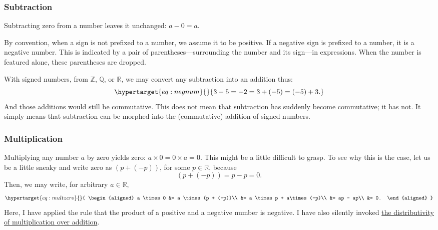 \documentclass[
  a4paper,
]{article}
\begin{document}
\hypertarget{subtraction}{%
\subsubsection{Subtraction}\label{subtraction}}

Subtracting zero from a number leaves it unchanged: \(a - 0 = a\).

By convention, when a sign is not prefixed to a number, we assume it to
be positive. If a negative sign is prefixed to a number, it is a
negative number. This is indicated by a pair of
parentheses---surrounding the number and its sign---in expressions. When
the number is featured alone, these parentheses are dropped.

With signed numbers, from \(\mathbb{Z}\), \(\mathbb{Q}\), or
\(\mathbb{R}\), we may convert any subtraction into an addition thus:
\begin{equation}\protect\hypertarget{eq:negnum}{}{
3 - 5 = -2 = 3 + (-5) = (-5) + 3.
}\label{eq:negnum}\end{equation} And those additions would still be
commutative. This does not mean that subtraction has suddenly become
commutative; it has not. It simply means that subtraction can be morphed
into the (commutative) addition of signed numbers.

\hypertarget{multiplication}{%
\subsubsection{Multiplication}\label{multiplication}}

Multiplying any number \(a\) by zero yields zero:
\(a \times 0 = 0 \times a = 0\). This might be a little difficult to
grasp. To see why this is the case, let us be a little sneaky and write
zero as \((p + (-p))\), for some \(p \in \mathbb{R}\), because \[
(p + (-p)) = p - p = 0.
\] Then, we may write, for arbitrary \(a \in \mathbb{R}\),
\begin{equation}\protect\hypertarget{eq:multzero}{}{
\begin{aligned}
a \times 0 &= a \times (p + (-p))\\
&= a \times p + a\times (-p)\\
&= ap - ap\\
&= 0.
\end{aligned}
}\label{eq:multzero}\end{equation} Here, I have applied the rule that
the product of a positive and a negative number is negative. I have also
silently invoked
\href{http://www.mathematicsdictionary.com/english/vmd/full/d/multiplicationoveraddition.htm}{the
distributivity of multiplication over addition}.
\end{document}
